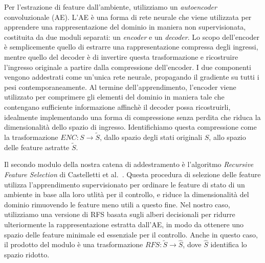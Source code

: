 Per l'estrazione di feature dall'ambiente, utilizziamo un \textit{autoencoder} 
convoluzionale (AE).
L'AE \`e una forma di rete neurale che viene utilizzata per apprendere una 
rappresentazione del dominio in maniera non supervisionata, costituita da due 
moduli separati: un \textit{encoder} e un \textit{decoder}.
Lo scopo dell'encoder \`e semplicemente quello di estrarre una rappresentazione
compressa degli ingressi, mentre quello del decoder \`e di invertire questa
trasformazione e ricostruire l'ingresso originale a partire dalla compressione 
dell'encoder. 
I due componenti vengono addestrati come un'unica rete neurale, propagando il 
gradiente su tutti i pesi contemporaneamente. 
Al termine dell'apprendimento, l'encoder viene utilizzato per comprimere gli 
elementi del dominio in maniera tale che contengano sufficiente informazione
affinch\`e il decoder possa ricostruirli, idealmente implementando una forma 
di compressione senza perdita che riduca la dimensionalit\`a dello spazio di
ingresso. 
Identifichiamo questa compressione come la trasformazione $ENC: S \rightarrow \tilde{S}$, 
dallo spazio degli stati originali $S$, allo spazio delle feature astratte $\tilde{S}$.

Il secondo modulo della nostra catena di addestramento \`e l'algoritmo 
\textit{Recursive Feature Selection} di Castelletti et al.\ \cite{castelletti2011tree}.
Questa procedura di selezione delle feature utilizza l'apprendimento supervisionato
per ordinare le feature di stato di un ambiente in base alla loro utlit\`a per 
il controllo, e riduce la dimensionalit\`a del dominio rimuovendo le feature 
meno utili a questo fine. 
Nel nostro caso, utilizziamo una versione di RFS basata sugli alberi decisionali
per ridurre ulteriormente la rappresentazione estratta dall'AE, in modo da 
ottenere uno spazio delle feature minimale ed essenziale per il controllo. 
Anche in questo caso, il prodotto del modulo \`e una trasformazione 
$RFS: \tilde{S} \rightarrow \hat{S}$, dove $\hat{S}$ identifica lo spazio 
ridotto. 

